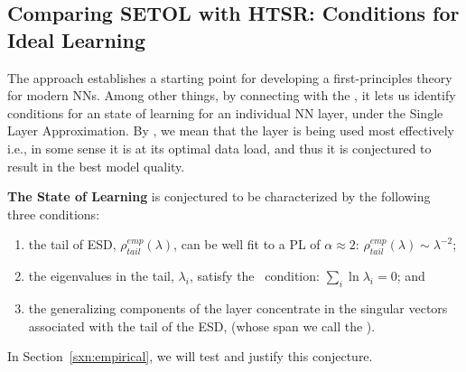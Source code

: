 \subsection{Comparing SETOL with HTSR: Conditions for Ideal Learning}
\label{sxn:ideal_learning}


The \SETOL approach establishes a starting point for developing a first-principles theory for modern NNs. %
Among other things, by connecting with the \HTSR \Phenomenology, it lets us identify conditions for an \Ideal state of learning for an individual NN layer, under the Single Layer Approximation.
By \Ideal, we mean that the layer is being used most effectively i.e., in some sense it is at its optimal data load, and thus it is conjectured to result in the best model quality.

\textbf{The \Ideal State of Learning} is conjectured to be characterized by the following three conditions:
\begin{enumerate} 
\item \label{itm:ideal_1}
  the tail of ESD, $\rho^{emp}_{tail}(\lambda)$, can be well fit to a PL of $\alpha\approx 2$: $\rho^{emp}_{tail}(\lambda)\sim\lambda^{-2}$;
\item \label{itm:ideal_2}
  the eigenvalues in the tail, $\lambda_{i}$, satisfy the \TRACELOG~condition: $\sum_{i}\ln\lambda_{i}=0$; and
\item \label{itm:ideal_3}
  the generalizing components of the layer concentrate in the singular vectors associated with the tail of the ESD, (whose span we call the \EffectiveCorrelationSpace).
\end{enumerate}
In Section~\ref{sxn:empirical}, we will test and justify this conjecture.




